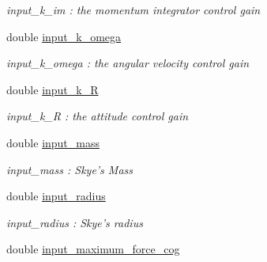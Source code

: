 \begin{DoxyCompactItemize}
\begin{DoxyCompactList}\small\item\em input\-\_\-k\-\_\-im \-: the momentum integrator control gain \end{DoxyCompactList}\item 
\hypertarget{struct_skye_parameters_a49e98c5bf14cc7ac7a7ad8a35b09cbb2}{double \hyperlink{struct_skye_parameters_a49e98c5bf14cc7ac7a7ad8a35b09cbb2}{input\-\_\-k\-\_\-omega}}\label{struct_skye_parameters_a49e98c5bf14cc7ac7a7ad8a35b09cbb2}

\begin{DoxyCompactList}\small\item\em input\-\_\-k\-\_\-omega \-: the angular velocity control gain \end{DoxyCompactList}\item 
\hypertarget{struct_skye_parameters_ad5566192a0f853462ba63e3ebcb0ba8d}{double \hyperlink{struct_skye_parameters_ad5566192a0f853462ba63e3ebcb0ba8d}{input\-\_\-k\-\_\-\-R}}\label{struct_skye_parameters_ad5566192a0f853462ba63e3ebcb0ba8d}

\begin{DoxyCompactList}\small\item\em input\-\_\-k\-\_\-\-R \-: the attitude control gain \end{DoxyCompactList}\item 
\hypertarget{struct_skye_parameters_a2b87d8983628d523ba2c00a0840ef4ff}{double \hyperlink{struct_skye_parameters_a2b87d8983628d523ba2c00a0840ef4ff}{input\-\_\-mass}}\label{struct_skye_parameters_a2b87d8983628d523ba2c00a0840ef4ff}

\begin{DoxyCompactList}\small\item\em input\-\_\-mass \-: Skye's Mass \end{DoxyCompactList}\item 
\hypertarget{struct_skye_parameters_ade9a962c46f28bf506f39a46da67bb80}{double \hyperlink{struct_skye_parameters_ade9a962c46f28bf506f39a46da67bb80}{input\-\_\-radius}}\label{struct_skye_parameters_ade9a962c46f28bf506f39a46da67bb80}

\begin{DoxyCompactList}\small\item\em input\-\_\-radius \-: Skye's radius \end{DoxyCompactList}\item 
\hypertarget{struct_skye_parameters_a0eed3d70a979c9672c9d017178711b14}{double \hyperlink{struct_skye_parameters_a0eed3d70a979c9672c9d017178711b14}{input\-\_\-maximum\-\_\-force\-\_\-cog}}\label{struct_skye_parameters_a0eed3d70a979c9672c9d017178711b14}


\end{DoxyCompactItemize}
